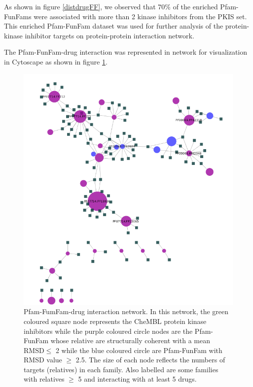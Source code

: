 \documentclass[a4paper, 11pt]{article}
\newcommand{\redcomment}[1]{\textcolor{red}{[#1]}} %
\begin{document}
As shown in figure \ref{distdrugFF}, we observed that 70\% of the enriched Pfam-FunFams were associated with more than 2 kinase inhibitors from the PKIS set. This enriched Pfam-FunFam dataset was used for further analysis of the protein-kinase inhibitor targets on protein-protein interaction network.\par
The Pfam-FunFam-drug interaction was represented in network for visualization in Cytoscape as shown in figure \ref{pfam-chembl}.
\begin{figure}[H]
	\includegraphics[width=.9\linewidth]{figures/pfam_chembl.png}
	\centering
	\caption{Pfam-FumFam-drug interaction network. In this network, the green coloured square node represents the CheMBL protein kinase inhibitors while the purple coloured circle nodes are the Pfam-FunFam whose relative are structurally coherent with a mean RMSD$\leq$ 2 while the blue coloured circle are Pfam-FunFam with RMSD value $\geq$ 2.5. The size of each node reflects the numbers of targets (relatives)
in each family. Also labelled are some families with relatives  $\geq$ 5 and interacting with at least 5 drugs.}
	\label{pfam-chembl}
\end{figure}
\end{document}
